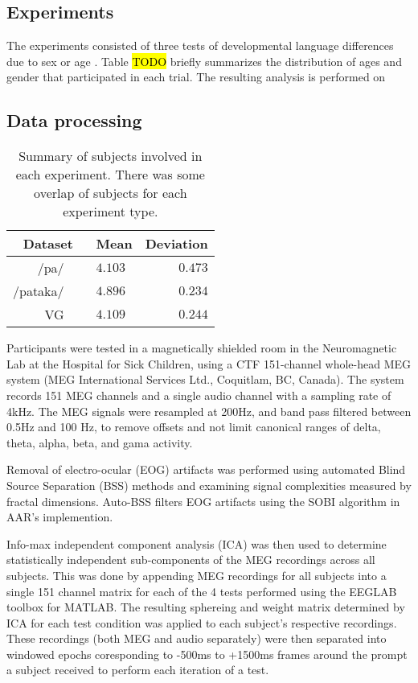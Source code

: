 \documentclass[a4paper]{article}
\newcommand{\FR}[1]{{\small \textcolor{red}{\hl{#1}}}}
\begin{document}
\subsection{Experiments}

The experiments consisted of three tests of developmental language differences due to sex or age \cite{Doesburg2016, Yu2014}. Table \FR{TODO} briefly summarizes the distribution of ages and gender that participated in each trial. The resulting analysis is performed on


\subsection{Data processing}
\begin{table}[t]
  \caption{Summary of subjects involved in each experiment. There was some overlap of subjects for each experiment type.}
  \label{tab:subjects}
  \centering
  \begin{tabular}{ r@{}l  r }
    \toprule
    \multicolumn{1}{c}{\textbf{Dataset}} & \multicolumn{1}{c}{\textbf{Mean}} & \multicolumn{1}{c}{\textbf{Deviation}} \\
    \midrule
    /pa/~~~                        & $4.103$         &     $0.473$       \\
    /pataka/~~~                          & $4.896$         &     $0.234$       \\
    VG~~~                       & $4.109$         &     $0.244$       \\
    \bottomrule
  \end{tabular}
\end{table}

Participants were tested in a magnetically shielded room in the Neuromagnetic Lab at the Hospital for Sick Children, using a CTF 151-channel whole-head MEG system (MEG International Services Ltd., Coquitlam, BC, Canada). The system records 151 MEG channels and a single audio channel with a sampling rate of 4kHz. The MEG signals were resampled at 200Hz, and band pass filtered between 0.5Hz and 100 Hz, to remove offsets and not limit canonical ranges of delta, theta, alpha, beta, and gama activity. %

Removal of electro-ocular (EOG) artifacts was performed using automated Blind Source Separation (BSS) methods and examining signal complexities measured by fractal dimensions. Auto-BSS filters EOG artifacts using the SOBI algorithm in AAR's implemention.

Info-max independent component analysis (ICA) \cite{Bell1995} was then used to determine statistically independent sub-components of the MEG recordings across all subjects. This was done by appending MEG recordings for all subjects into a single 151 channel matrix for each of the 4 tests performed using the EEGLAB toolbox \cite{Delorme04eeglab} for MATLAB. The resulting sphereing and weight matrix determined by ICA for each test condition was applied to each subject's respective recordings. These recordings (both MEG and audio separately) were then separated into windowed epochs coresponding to -500ms to +1500ms frames around the prompt a subject received to perform each iteration of a test.
\end{document}
